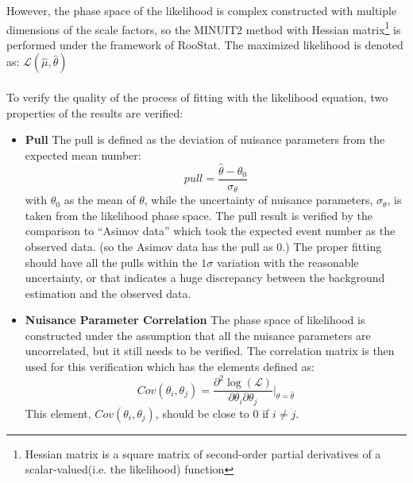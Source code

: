 However, the phase space of the likelihood is complex constructed with multiple dimensions of the scale factors, so the MINUIT2\cite{minuit} method with Hessian matrix\footnote{Hessian matrix is a square matrix of second-order partial derivatives of a scalar-valued(i.e. the likelihood) function} is performed under the framework of RooStat\cite{Moneta:2010pm}. The maximized likelihood is denoted as: $\mathcal{L}(\hat{\mu}, \hat{\theta})$
\\
\\To verify the quality of the process of fitting with the likelihood equation, two properties of the results are verified: 
\begin{itemize}
	\item {\bf Pull} The pull is defined as the deviation of nuisance parameters from the expected mean number:
	\begin{equation}
	pull=\frac{\hat{\theta}-\theta_0}{\sigma_{\theta}}
	\end{equation}
	with $\theta_0$ as the mean of $\theta$, while the uncertainty of nuisance parameters, $\sigma_\theta$, is taken from the likelihood phase space. The pull result is verified by the comparison to ``Asimov data'' which took the expected event number as the observed data. (so the Asimov data has the pull as 0.)  The proper fitting should have all the pulls within the $1\sigma$ variation with the reasonable uncertainty, or that indicates a huge discrepancy between the background estimation and the observed data. 
	\item {\bf Nuisance Parameter Correlation} The phase space of likelihood is constructed under the assumption that all the nuisance parameters are uncorrelated, but it still needs to be verified. The correlation matrix is then used for this verification which has the elements defined as:
	\begin{equation}
	Cov(\theta_i, \theta_j) = \frac{\partial^2\log(\mathcal{L})}{\partial\theta_i \partial\theta_j}|_{\theta=\hat{\theta}}
	\end{equation}
	This element, $Cov(\theta_i, \theta_j)$, should be close to 0 if $i\neq j$.
\end{itemize}

